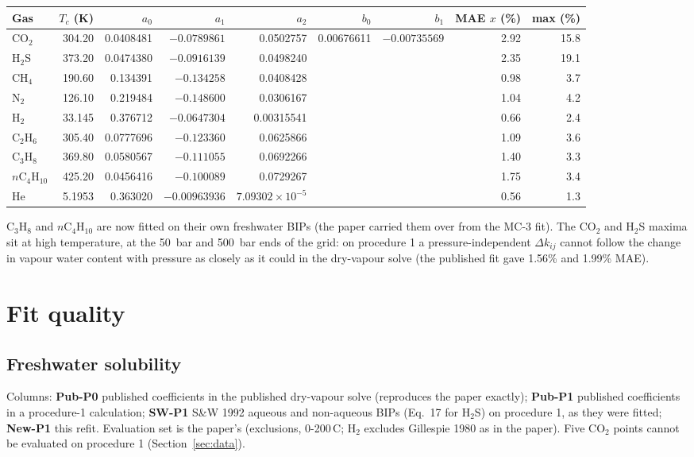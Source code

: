 \documentclass[10pt,a4paper]{article}
\begin{document}
\begin{center}\footnotesize\setlength{\tabcolsep}{4pt}
\begin{tabular}{lrrrrrrrr}
\toprule
Gas & $T_c$ (K) & $a_0$ & $a_1$ & $a_2$ & $b_0$ & $b_1$ & MAE $x$ (\%) & max (\%) \\
\midrule
CO$_2$ & 304.20 & 0.0408481 & $-0.0789861$ & 0.0502757 & 0.00676611 & $-0.00735569$ & 2.92 & 15.8 \\
H$_2$S & 373.20 & 0.0474380 & $-0.0916139$ & 0.0498240 & & & 2.35 & 19.1 \\
CH$_4$ & 190.60 & 0.134391 & $-0.134258$ & 0.0408428 & & & 0.98 & 3.7 \\
N$_2$ & 126.10 & 0.219484 & $-0.148600$ & 0.0306167 & & & 1.04 & 4.2 \\
H$_2$ & 33.145 & 0.376712 & $-0.0647304$ & 0.00315541 & & & 0.66 & 2.4 \\
C$_2$H$_6$ & 305.40 & 0.0777696 & $-0.123360$ & 0.0625866 & & & 1.09 & 3.6 \\
C$_3$H$_8$ & 369.80 & 0.0580567 & $-0.111055$ & 0.0692266 & & & 1.40 & 3.3 \\
$n$C$_4$H$_{10}$ & 425.20 & 0.0456416 & $-0.100089$ & 0.0729267 & & & 1.75 & 3.4 \\
He & 5.1953 & 0.363020 & $-0.00963936$ & $7.09302{\times}10^{-5}$ & & & 0.56 & 1.3 \\
\bottomrule
\end{tabular}
\end{center}

C$_3$H$_8$ and $n$C$_4$H$_{10}$ are now fitted on their own freshwater BIPs (the paper carried them over from the MC-3 fit). The CO$_2$ and H$_2$S maxima sit at high temperature, at the 50~bar and 500~bar ends of the grid: on procedure 1 a pressure-independent $\Delta k_{ij}$ cannot follow the change in vapour water content with pressure as closely as it could in the dry-vapour solve (the published fit gave 1.56\% and 1.99\% MAE).

\section{Fit quality}

\subsection{Freshwater solubility}\label{sec:fresh}
Columns: \textbf{Pub-P0} published coefficients in the published dry-vapour solve (reproduces the paper exactly); \textbf{Pub-P1} published coefficients in a procedure-1 calculation; \textbf{SW-P1} S\&W 1992 aqueous and non-aqueous BIPs (Eq.~17 for H$_2$S) on procedure 1, as they were fitted; \textbf{New-P1} this refit. Evaluation set is the paper's (exclusions, 0-200\,\textdegree C; H$_2$ excludes Gillespie 1980 as in the paper). Five CO$_2$ points cannot be evaluated on procedure 1 (Section~\ref{sec:data}).
\end{document}
